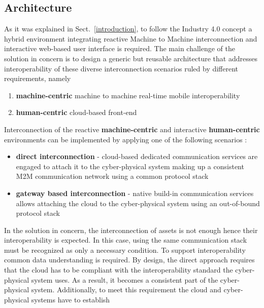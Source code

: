 \documentclass{jacsart}
\providecommand{\tightlist} { \setlength{\itemsep}{0pt}\setlength{\parskip}{0pt}}
\begin{document}
\hypertarget{architecture}{%
\subsection{Architecture}\label{architecture}}

As it was explained in Sect.~\ref*{introduction}, to follow the Industry 4.0 concept a hybrid environment integrating reactive Machine to Machine
interconnection and interactive web-based user interface is required.
The main challenge of the solution in concern is to design a generic but
reusable architecture that addresses interoperability of these diverse
interconnection scenarios ruled by different requirements, namely

\begin{enumerate}
\def\labelenumi{\arabic{enumi}.}
\tightlist
\item
  \textbf{machine-centric} machine to machine real-time mobile
  interoperability
\item
  \textbf{human-centric} cloud-based front-end
\end{enumerate}

Interconnection of the reactive \textbf{machine-centric} and interactive \textbf{human-centric} environments can be implemented by applying one of the following scenarios :

\begin{itemize}
\tightlist
\item
  \textbf{direct interconnection} - cloud-based dedicated communication
  services are engaged to attach it to the cyber-physical system making
  up a consistent M2M communication network using a common protocol
  stack
\item
  \textbf{gateway based interconnection} - native build-in communication
  services allows attaching the cloud to the cyber-physical system using
  an out-of-bound protocol stack
\end{itemize}

In the solution in concern, the interconnection of assets is not enough
hence their interoperability is expected. In this case, using the same
communication stack must be recognized as only a necessary condition. To
support interoperability common data understanding is required. By
design, the direct approach requires that the cloud has to be compliant
with the interoperability standard the cyber-physical system uses. As a
result, it becomes a consistent part of the cyber-physical system.
Additionally, to meet this requirement the cloud and cyber-physical
systems have to establish
\end{document}
